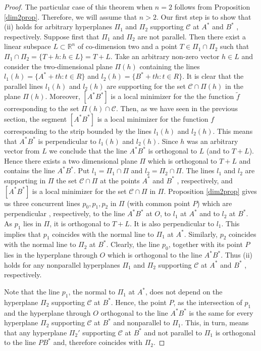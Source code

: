 \documentclass[a4paper,12pt]{amsart}
\begin{document}
\begin{proof}
The particular case of this theorem when $n=2$ follows from
Proposition \ref{dim2prop}. Therefore, we will assume that $n
> 2$. Our first step is to show that  (ii) holds for arbitrary hyperplanes
$\Pi_1$ and $\Pi_2$ supporting $\mathcal C$ at $A^*$ and $B^*$ ,
respectively. Suppose first that $\Pi_1$ and $\Pi_2$ are not
parallel. Then there exist a linear subspace $L \subset
\mathbb{R}^n$ of co-dimension two and a point $T \in \Pi_1 \cap
\Pi_2 $ such that $\Pi_1 \cap \Pi_2 = \{T + h: h \in L\} = T + L$.
Take an arbitrary non-zero vector $h \in L $ and consider the
two-dimensional plane $\Pi(h)$ containing the lines $l_1(h)=\{A^*
+ th: t \in R\}$ and $l_2(h)=\{B^* + th: t \in R\}$. It is clear
that the parallel lines  $l_1(h)$ and $l_2(h)$ are supporting for
the set $\mathcal C \cap \Pi(h)$ in the plane $\Pi(h)$. Moreover,
$[A^*B^*]$ is a local minimizer for the the function $\tilde{f}$ corresponding to the set $\Pi(h) \cap \mathcal
C $. Then, as we have seen in the previous section, the segment $[A^*B^*]$ is a local minimizer for the function $f$ corresponding to the strip bounded by the lines $l_1(h)$ and $l_2(h)$. This means that $A^*B^*$ is perpendicular to  $l_1(h)$ and $l_2(h)$.
Since $h$ was an arbitrary vector from $L$ we
conclude that the line $A^*B^*$ is orthogonal to $L$ (and to
$T+L$).
 Hence there exists a two dimensional plane $\Pi$ which is orthogonal to $T+ L$ and contains the line $A^*B^*$. Put $l_1 = \Pi_1 \cap \Pi$ and $l_2 =\Pi_2 \cap \Pi$.
 The lines $l_1$ and $l_2$ are supporting in $\Pi$ the set $\mathcal C \cap \Pi$ at the points $A^*$ and $B^*$ , respectively, and $[A^*B^*]$ is a local minimizer for the set $\mathcal C \cap \Pi$  in $\Pi$.
 Proposition \ref{dim2prop} gives us three concurrent lines $p_0, p_1, p_2$ in $\Pi$ (with common point $P$)
 which are perpendicular , respectively, to the line $A^*B^*$ at $O$, to $l_1$ at $A^*$ and to $l_2$ at $B^*$.
 As $p_1$ lies in $\Pi$, it is orthogonal to $ T + L$. It is also perpendicular to $l_1$.
This implies that $p_1$ coincides with the normal line to $\Pi_1$ at $A^*$.
 Similarly, $p_2$ coincides with the normal line to $\Pi_2$ at $B^*$. Clearly, the line $p_0$, together with its point $P$ lies in the hyperplane through $O$ which is orthogonal to the line $A^*B^*$.
 Thus (ii)  holds for any nonparallel hyperplanes $\Pi_1$ and $\Pi_2$ supporting $\mathcal C$ at $A^*$ and $B^*$ , respectively.

 \smallskip


 Note that the line $p_1$, the normal to $\Pi_1$ at $A^*$, does not depend on the hyperplane $\Pi_2$ supporting $\mathcal C$ at $B^*$.
 Hence, the point $P$, as the intersection of $p_1$ and the hyperplane through $O$
 orthogonal to the line $A^*B^*$ is the same for every hyperplane $\Pi_2$ supporting $\mathcal C$ at $B^*$ and
 nonparallel to $\Pi_1$. This, in turn, means that any hyperplane $\Pi_2'$ supporting $\mathcal C$ at $B^*$ and
 not parallel to $\Pi_1$ is orthogonal to the line $PB^*$ and, therefore coincides with $\Pi_2$.


\end{proof}
\end{document}
